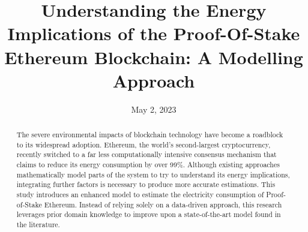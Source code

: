 \documentclass[sotoncolour]{uosthesis}      %
\title      {Understanding the Energy Implications of the Proof-Of-Stake Ethereum Blockchain: A Modelling Approach}
\date       {May 2, 2023}
\begin{document}

\justifying                  %
\frontmatter
\maketitle
\restoregeometry
\begin{abstract}
    The severe environmental impacts of blockchain technology have become a roadblock to its widespread adoption.  Ethereum, the world's second-largest cryptocurrency, recently switched to a far less computationally intensive consensus mechanism that claims to reduce its energy consumption by over 99\%. Although existing approaches mathematically model parts of the system to try to understand its energy implications, integrating further factors is necessary to produce more accurate estimations. This study introduces an enhanced model to estimate the electricity consumption of Proof-of-Stake Ethereum. Instead of relying solely on a data-driven approach, this research leverages prior domain knowledge to improve upon a state-of-the-art model found in the literature.
\end{abstract}


\tableofcontents
\listoffigures
\listoftables
\end{document}
